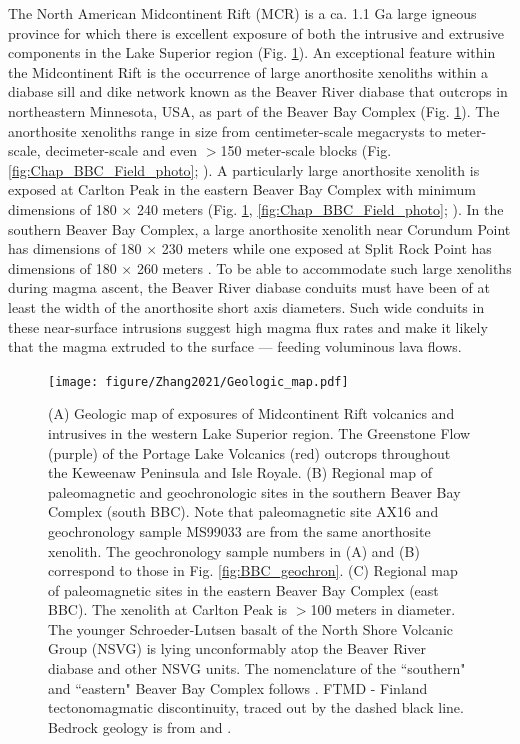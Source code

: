 The North American Midcontinent Rift (MCR) is a ca. 1.1 Ga large igneous province for which there is excellent exposure of both the intrusive and extrusive components in the Lake Superior region (Fig. \ref{Chap_BBC_Geologic_map}). An exceptional feature within the Midcontinent Rift is the occurrence of large anorthosite xenoliths within a diabase sill and dike network known as the Beaver River diabase that outcrops in northeastern Minnesota, USA, as part of the Beaver Bay Complex (Fig. \ref{Chap_BBC_Geologic_map}). The anorthosite xenoliths range in size from centimeter-scale megacrysts to meter-scale, decimeter-scale and even $>$150 meter-scale blocks (Fig. \ref{fig:Chap_BBC_Field_photo}; \citealp{Morrison1983a, Grout1939a}). A particularly large anorthosite xenolith is exposed at Carlton Peak in the eastern Beaver Bay Complex with minimum dimensions of 180 $\times$ 240 meters (Fig. \ref{Chap_BBC_Geologic_map}, \ref{fig:Chap_BBC_Field_photo}; \citealp{Boerboom2006b}). In the southern Beaver Bay Complex, a large anorthosite xenolith near Corundum Point has dimensions of 180 $\times$ 230 meters while one exposed at Split Rock Point has dimensions of 180 $\times$ 260 meters \citep{Boerboom2004a}. To be able to accommodate such large xenoliths during magma ascent, the Beaver River diabase conduits must have been of at least the width of the anorthosite short axis diameters. Such wide conduits in these near-surface intrusions suggest high magma flux rates and make it likely that the magma extruded to the surface --- feeding voluminous lava flows.  

\begin{figure}[h!]
\noindent\texttt{[image: figure/Zhang2021/Geologic\_map.pdf]}
\centering
\caption[Simplified geologic map of the Midcontinent Rift and regional maps of the Beaver Bay Complex]{\footnotesize{(A) Geologic map of exposures of Midcontinent Rift volcanics and intrusives in the western Lake Superior region. The Greenstone Flow (purple) of the Portage Lake Volcanics (red) outcrops throughout the Keweenaw Peninsula and Isle Royale. (B) Regional map of paleomagnetic and geochronologic sites in the southern Beaver Bay Complex (south BBC). Note that paleomagnetic site AX16 and geochronology sample MS99033 are from the same anorthosite xenolith. The geochronology sample numbers in (A) and (B) correspond to those in Fig. \ref{fig:BBC_geochron}. (C) Regional map of paleomagnetic sites in the eastern Beaver Bay Complex (east BBC). The xenolith at Carlton Peak is $>$100 meters in diameter. The younger Schroeder-Lutsen basalt of the North Shore Volcanic Group (NSVG) is lying unconformably atop the Beaver River diabase and other NSVG units. The nomenclature of the ``southern" and ``eastern" Beaver Bay Complex follows \cite{Miller1997a}. FTMD - Finland tectonomagmatic discontinuity, traced out by the dashed black line. Bedrock geology is from \cite{Miller2001a} and \cite{Jirsa2011a}.}}
\label{Chap_BBC_Geologic_map}
\end{figure}

